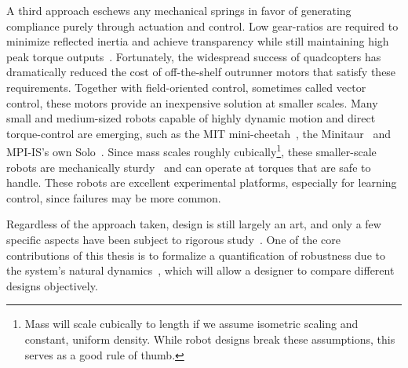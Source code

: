 A third approach eschews any mechanical springs in favor of generating compliance purely through actuation and control. Low gear-ratios are required to minimize reflected inertia and achieve transparency while still maintaining high peak torque outputs~\cite{Seok2012proprioceptive}.
Fortunately, the widespread success of quadcopters has dramatically reduced the cost of off-the-shelf outrunner motors that satisfy these requirements. Together with field-oriented control, sometimes called vector control, these motors provide an inexpensive solution at smaller scales. Many small and medium-sized robots capable of highly dynamic motion and direct torque-control are emerging, such as the MIT mini-cheetah~\cite{katz2019mini}, the Minitaur~\cite{kenneally2016design} and MPI-IS's own Solo~\cite{grimminger2019open}. Since mass scales roughly cubically\footnote{Mass will scale cubically to length if we assume isometric scaling and constant, uniform density. While robot designs break these assumptions, this serves as a good rule of thumb.}, these smaller-scale robots are mechanically sturdy~\cite{biewener2005biomechanical} and can operate at torques that are safe to handle. These robots are excellent experimental platforms, especially for learning control, since failures may be more common. \par
Regardless of the approach taken, design is still largely an art, and only a few specific aspects have been subject to rigorous study~\cite{abate2015passive,abate2016antagonism}. One of the core contributions of this thesis is to formalize a quantification of robustness due to the system's natural dynamics~\cite{heim2019beyond}, which will allow a designer to compare different designs objectively.




